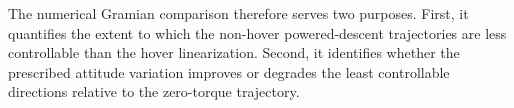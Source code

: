The numerical Gramian comparison therefore serves two purposes. First, it quantifies the extent to which the non-hover powered-descent trajectories are less controllable than the hover linearization. Second, it identifies whether the prescribed attitude variation improves or degrades the least controllable directions relative to the zero-torque trajectory.
